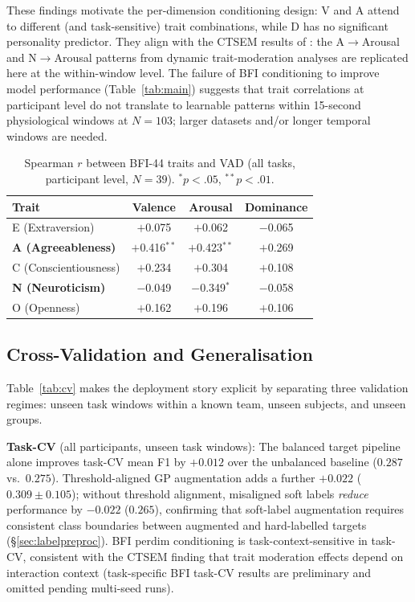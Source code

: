\documentclass[sigconf,nonacm]{acmart}
\begin{document}
These findings motivate the per-dimension conditioning design: V and A
attend to different (and task-sensitive) trait combinations, while
D has no significant personality predictor.
They align with the CTSEM results of \citeauthor{meng2026moderating}:
the A$\to$Arousal and N$\to$Arousal patterns from dynamic trait-moderation
analyses are replicated here at the within-window level.
The failure of BFI conditioning to improve model performance
(Table~\ref{tab:main}) suggests that trait correlations at participant level
do not translate to learnable patterns within 15-second physiological windows
at $N = 103$; larger datasets and/or longer temporal windows are needed.

\begin{table}[t]
\caption{Spearman $r$ between BFI-44 traits and VAD (all tasks,
  participant level, $N=39$). $^*p < .05$, $^{**}p < .01$.}
\label{tab:bfi_corr}
\centering
\setlength{\tabcolsep}{5pt}
\begin{tabular}{lccc}
\toprule
\textbf{Trait} & \textbf{Valence} & \textbf{Arousal} & \textbf{Dominance} \\
\midrule
E (Extraversion)     & $+$0.075     & $+$0.062       & $-$0.065 \\
\textbf{A (Agreeableness)} & $+$0.416$^{**}$ & $+$0.423$^{**}$ & $+$0.269 \\
C (Conscientiousness)& $+$0.234     & $+$0.304       & $+$0.108 \\
\textbf{N (Neuroticism)}   & $-$0.049     & $-$0.349$^{*}$ & $-$0.058 \\
O (Openness)         & $+$0.162     & $+$0.196       & $+$0.106 \\
\bottomrule
\end{tabular}
\end{table}

\subsection{Cross-Validation and Generalisation}
\label{sec:cv}

Table~\ref{tab:cv} makes the deployment story explicit by separating three
validation regimes: unseen task windows within a known team, unseen subjects,
and unseen groups.

\textbf{Task-CV} (all participants, unseen task windows):
The balanced target pipeline alone improves task-CV mean F1
by $+0.012$ over the unbalanced baseline ($0.287$ vs.\ $0.275$).
Threshold-aligned GP augmentation adds a further $+0.022$
($0.309 \pm 0.105$); without threshold alignment, misaligned soft labels
\emph{reduce} performance by $-0.022$ ($0.265$), confirming that soft-label
augmentation requires consistent class boundaries between augmented and
hard-labelled targets (§\ref{sec:labelpreproc}).
BFI perdim conditioning is task-context-sensitive in task-CV,
consistent with the CTSEM finding that trait moderation effects depend
on interaction context (task-specific BFI task-CV results are preliminary
and omitted pending multi-seed runs).
\end{document}
